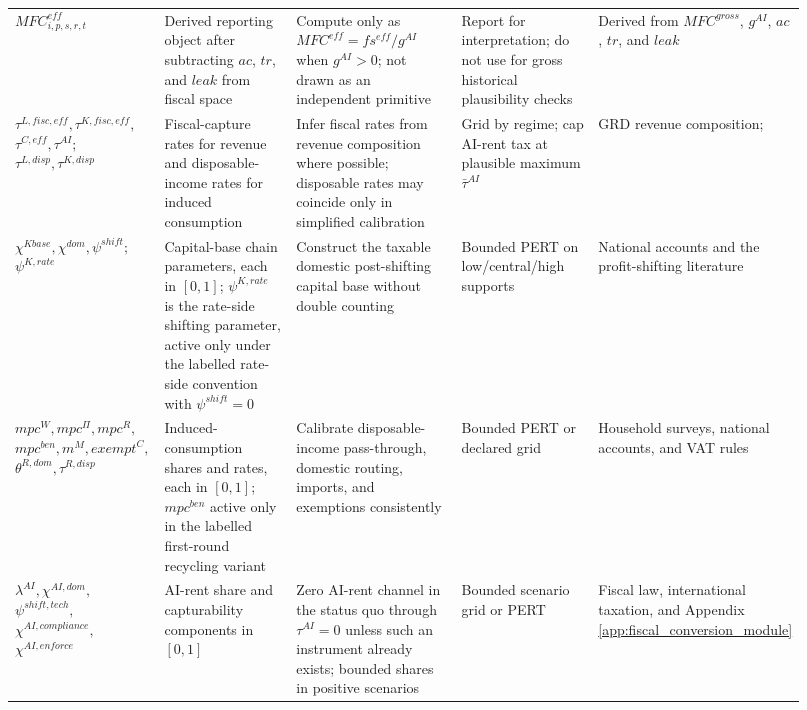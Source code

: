 \documentclass[11pt,a4paper]{article}
\begin{document}
\begin{landscape}
\begin{longtable}{@{}p{0.14\linewidth}p{0.22\linewidth}p{0.25\linewidth}p{0.20\linewidth}p{0.11\linewidth}@{}}
$MFC^{eff}_{i,p,s,r,t}$ & Derived reporting object after subtracting $ac$, $tr$, and $leak$ from fiscal space & Compute only as $MFC^{eff}=fs^{eff}/g^{AI}$ when $g^{AI}>0$; not drawn as an independent primitive & Report for interpretation; do not use for gross historical plausibility checks & Derived from $MFC^{gross}$, $g^{AI}$, $ac$, $tr$, and $leak$ \\
$\tau^{L,fisc,eff},\tau^{K,fisc,eff},$\newline $\tau^{C,eff},\tau^{AI};$\newline $\tau^{L,disp},\tau^{K,disp}$ & Fiscal-capture rates for revenue and disposable-income rates for induced consumption & Infer fiscal rates from revenue composition where possible; disposable rates may coincide only in simplified calibration & Grid by regime; cap AI-rent tax at plausible maximum $\bar\tau^{AI}$ & GRD revenue composition; \citet{brollo2024fiscal} \\
$\chi^{Kbase},\chi^{dom},\psi^{shift};$\newline $\psi^{K,rate}$ & Capital-base chain parameters, each in $[0,1]$; $\psi^{K,rate}$ is the rate-side shifting parameter, active only under the labelled rate-side convention with $\psi^{shift}=0$ & Construct the taxable domestic post-shifting capital base without double counting & Bounded PERT on low/central/high supports & National accounts and the profit-shifting literature \citep{beer2020international} \\
$mpc^W,mpc^{\Pi},mpc^R,$\newline $mpc^{ben},m^M,exempt^C,$\newline $\theta^{R,dom},\tau^{R,disp}$ & Induced-consumption shares and rates, each in $[0,1]$; $mpc^{ben}$ active only in the labelled first-round recycling variant & Calibrate disposable-income pass-through, domestic routing, imports, and exemptions consistently & Bounded PERT or declared grid & Household surveys, national accounts, and VAT rules \\
$\lambda^{AI},\chi^{AI,dom},$\newline $\psi^{shift,tech},$\newline $\chi^{AI,compliance},$\newline $\chi^{AI,enforce}$ & AI-rent share and capturability components in $[0,1]$ & Zero AI-rent channel in the status quo through $\tau^{AI}=0$ unless such an instrument already exists; bounded shares in positive scenarios & Bounded scenario grid or PERT & Fiscal law, international taxation, and Appendix \ref{app:fiscal_conversion_module} \\

\end{longtable}
\end{landscape}
\end{document}
